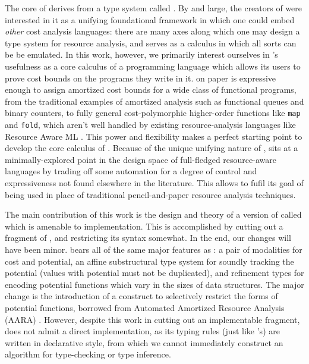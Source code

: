 The core of \lambdaamorimpl derives from a type system called \lambdaamor \cite{rajani-et-al:popl21}. By and large, the creators of \lambdaamor were interested in it as a unifying foundational framework in which one could embed \textit{other} cost analysis languages: there are many axes along which one may design a type system for resource analysis, and \lambdaamor serves as a calculus in which all sorts can be be emulated. In this work, however, we primarily interest ourselves in \lambdaamor's usefulness as a core calculus of a programming language which allows its users to prove cost bounds on the programs they write in it. \lambdaamor on paper is expressive enough to assign amortized cost bounds for a wide class of functional programs, from the traditional examples of amortized analysis such as functional queues and binary counters, to fully general cost-polymorphic higher-order functions like \texttt{map} and \texttt{fold}, which aren't well handled by existing resource-analysis languages like Resource Aware ML \cite{hoffmann-et-al:cav12}. This power and flexibility makes \lambdaamor a perfect starting point to develop the core calculus of \lambdaamorimpl. Because of the unique unifying nature of \lambdaamor, \lambdaamorimpl sits at a minimally-explored point in the design space of full-fledged resource-aware languages by trading off some automation for a degree of control and expressiveness not found elsewhere in the literature. This allows \lambdaamorimpl to fufil its goal of being used in place of traditional pencil-and-paper resource analysis techniques. 

The main contribution of this work is the design and theory of a version of \lambdaamor called \dlambdaamor which is amenable to implementation. This is accomplished by cutting out a fragment of \lambdaamor, and restricting its syntax somewhat. In the end, our changes will have been minor. \dlambdaamor bears all of the same major features as \lambdaamor: a pair of modalities for cost and potential, an affine substructural type system for soundly tracking the potential (values with potential must not be duplicated), and refinement types for encoding potential functions which vary in the sizes of data structures. The major change is the introduction of a construct to selectively restrict the forms of potential functions, borrowed from Automated Amortized Resource Analysis (AARA) \cite{hoffmann-et-al:esop10}. However, despite this work in cutting out an implementable fragment, \dlambdaamor does not admit a direct implementation, as its typing rules (just like \lambdaamor's) are written in declarative style, from which we cannot immediately construct an algorithm for type-checking or type inference. 

